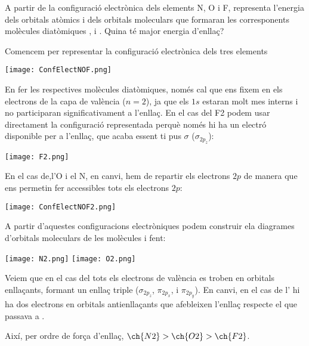\documentclass[11pt]{article}
\begin{document}
{A partir de la configuració electrònica dels elements N, O i F, representa l'energia dels orbitals atòmics i dels orbitals moleculars que formaran les corresponents molècules diatòmiques ,  i . Quina té major energia d'enllaç?
}
{
\vfill
\newpage
}
{
Comencem per representar la configuració electrònica dels tres elements
\begin{center}
\texttt{[image: ConfElectNOF.png]}
\end{center}
En fer les respectives molècules diatòmiques, només cal que ens fixem en els electrons de la capa de valència ($n=2$), ja que els $1s$ estaran molt mes interns i no participaran significativament a l'enllaç.
En el cas del F2 podem usar directament la configuració representada perquè només hi ha un electró disponible per a l'enllaç, que acaba essent ti pus $\sigma$ ($\sigma_{2p_z}$):
\begin{center}
\texttt{[image: F2.png]}
\end{center}
En el cas de,l'O i el N, en canvi, hem de repartir els electrons $2p$ de manera que ens permetin fer accessibles tots els electrons $2p$:
\begin{center}
\texttt{[image: ConfElectNOF2.png]}
\end{center}
A partir d'aquestes configuracions electròniques podem construir ela diagrames d'orbitals moleculars de les molècules  i  fent:
\begin{center}
\texttt{[image: N2.png]}
\texttt{[image: O2.png]}
\end{center}
Veiem que en el cas del  tots els electrons de valència es troben en orbitals enllaçants, formant un enllaç triple ($\sigma_{2p_z}$, $\pi_{2p_x}$, i $\pi_{2p_y}$). En canvi, en el cas de l' hi ha dos electrons en orbitals antienllaçants que afebleixen l'enllaç respecte el que passava a . 

Així, per ordre de força d'enllaç, $\ch{N2} > \ch{O2} > \ch{F2}$.
}
\end{document}
